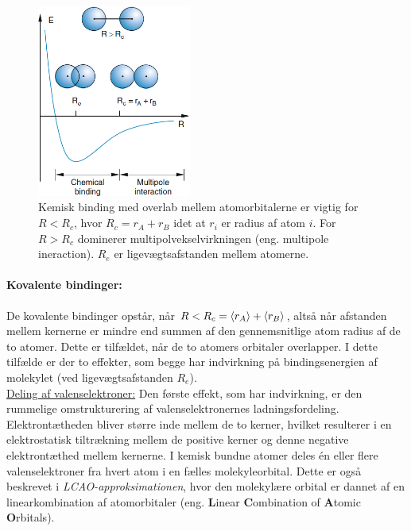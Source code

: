 \begin{figure}[!h]
    \centering
    \includegraphics[width=0.45\textwidth]{Q19/images/ReasonsForBinding.PNG}
    \caption{Kemisk binding med overlab mellem atomorbitalerne er vigtig for $R < R_c$, hvor $R_c = r_A + r_B$ idet at $r_i$ er radius af atom $i$. For $R > R_c$ dominerer multipolvekselvirkningen (eng. multipole ineraction). $R_e$ er ligevægtsafstanden mellem atomerne.}
    \label{fig:Q19_ReasonsForMolecularBinding}
\end{figure}


\paragraph{Kovalente bindinger:} De kovalente bindinger opstår, når $R < R_c = \Braket{r_A} + \Braket{r_B}$, altså når afstanden mellem kernerne er mindre end summen af den gennemsnitlige atom radius af de to atomer. Dette er tilfældet, når de to atomers orbitaler overlapper. I dette tilfælde er der to effekter, som begge har indvirkning på bindingsenergien af molekylet (ved ligevægtsafstanden $R_e$).\\

\underline{Deling af valenselektroner:} Den første effekt, som har indvirkning, er den rummelige omstrukturering af valenselektronernes ladningsfordeling. Elektrontætheden bliver større inde mellem de to kerner, hvilket resulterer i en elektrostatisk tiltrækning mellem de positive kerner og denne negative elektrontæthed mellem kernerne. I kemisk bundne atomer deles én eller flere valenselektroner fra hvert atom i en fælles molekyleorbital. Dette er også beskrevet i \emph{LCAO-approksimationen}, hvor den molekylære orbital er dannet af en linearkombination af atomorbitaler (eng. \textbf{L}inear \textbf{C}ombination of \textbf{A}tomic \textbf{O}rbitals).\\

